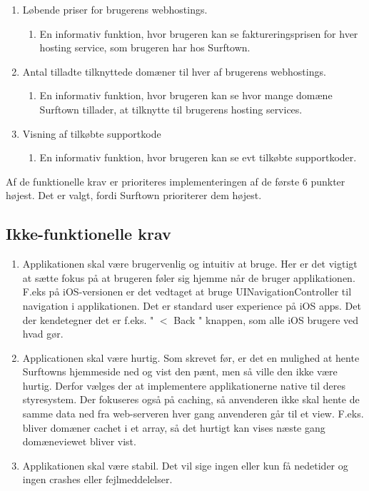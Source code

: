 \documentclass[12pt]{article}
\begin{document}
\begin{enumerate}
\begin{enumerate}
	\end{enumerate}
  \item{Løbende priser for brugerens webhostings.}
	\begin{enumerate}
		\item{En informativ funktion, hvor brugeren kan se faktureringsprisen for hver hosting service, som brugeren har hos Surftown.}
	\end{enumerate}
  \item{Antal tilladte tilknyttede domæner til hver af brugerens webhostings.}
	\begin{enumerate}
		\item{En informativ funktion, hvor brugeren kan se hvor mange domæne Surftown tillader, at tilknytte til brugerens hosting services.}
	\end{enumerate}
  \item{Visning af tilkøbte supportkode}
	\begin{enumerate}
		\item{En informativ funktion, hvor brugeren kan se evt tilkøbte supportkoder.}
	\end{enumerate}
\end{enumerate}
Af de funktionelle krav er prioriteres implementeringen af de første 6 punkter højest. Det er valgt, fordi Surftown prioriterer dem højest.
\subsection*{Ikke-funktionelle krav}
\label{nonfunctionlist}
\begin{enumerate}
  \item{Applikationen skal være brugervenlig og intuitiv at bruge. Her er det vigtigt at sætte fokus på at brugeren føler sig hjemme når de bruger applikationen. F.eks på iOS-versionen er det vedtaget at bruge UINavigationController til navigation i applikationen. Det er standard user experience på iOS apps. Det der kendetegner det er f.eks. " $ < $ Back " knappen, som alle iOS brugere ved hvad gør.}
  \item{Applicationen skal være hurtig. Som skrevet før, er det en mulighed at hente Surftowns hjemmeside ned og vist den pænt, men så ville den ikke være hurtig. Derfor vælges der at implementere applikationerne native til deres styresystem. Der fokuseres også på caching, så anvenderen ikke skal hente de samme data ned fra web-serveren hver gang anvenderen går til et view. F.eks. bliver domæner cachet i et array, så det hurtigt kan vises næste gang domæneviewet bliver vist.}
  \item{Applikationen skal være stabil. Det vil sige ingen eller kun få nedetider og ingen crashes eller fejlmeddelelser. }
\end{enumerate}
\end{document}
